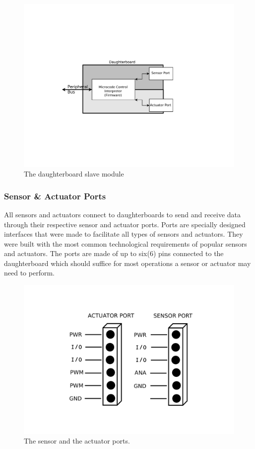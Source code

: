 	\begin{figure}[h]
	  \begin{center}
	    \includegraphics[width=1.0\columnwidth]{Figures/db.pdf}
	    \caption{The daughterboard slave module}
	  \end{center}
	\end{figure}
	
	\subsubsection{Sensor \& Actuator Ports} %
	\label{ssub:input_&_output_ports}
	All sensors and actuators connect to daughterboards to send and receive data through their respective sensor and actuator ports. Ports are specially designed interfaces that were made to facilitate all types of sensors and actuators. They were built with the most common technological requirements of popular sensors and actuators. The ports are made of up to six(6) pins connected to the daughterboard which should suffice for most operations a sensor or actuator may need to perform.

\begin{figure}[h]
  \begin{center}
    \includegraphics[width=0.5\columnwidth]{Figures/Ports.pdf}
    \caption{The sensor and the actuator ports.}
  \end{center}
\end{figure}

